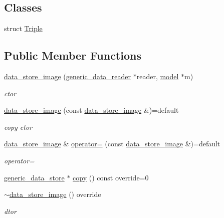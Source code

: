 \subsection*{Classes}
\begin{DoxyCompactItemize}
\item 
struct \hyperlink{structlbann_1_1data__store__image_1_1Triple}{Triple}
\end{DoxyCompactItemize}
\subsection*{Public Member Functions}
\begin{DoxyCompactItemize}
\item 
\hyperlink{classlbann_1_1data__store__image_a8fd8c5546f405a964511823aed8ac986}{data\+\_\+store\+\_\+image} (\hyperlink{classlbann_1_1generic__data__reader}{generic\+\_\+data\+\_\+reader} $\ast$reader, \hyperlink{classlbann_1_1model}{model} $\ast$m)
\begin{DoxyCompactList}\small\item\em ctor \end{DoxyCompactList}\item 
\hyperlink{classlbann_1_1data__store__image_a12a813dca36d7faf2e3b36635faf2aab}{data\+\_\+store\+\_\+image} (const \hyperlink{classlbann_1_1data__store__image}{data\+\_\+store\+\_\+image} \&)=default
\begin{DoxyCompactList}\small\item\em copy ctor \end{DoxyCompactList}\item 
\hyperlink{classlbann_1_1data__store__image}{data\+\_\+store\+\_\+image} \& \hyperlink{classlbann_1_1data__store__image_a997fd4f7961b173e1b03dfe1d81ad96f}{operator=} (const \hyperlink{classlbann_1_1data__store__image}{data\+\_\+store\+\_\+image} \&)=default
\begin{DoxyCompactList}\small\item\em operator= \end{DoxyCompactList}\item 
\hyperlink{classlbann_1_1generic__data__store}{generic\+\_\+data\+\_\+store} $\ast$ \hyperlink{classlbann_1_1data__store__image_ab62efcb2dbe3118bf2815fa5d51fee61}{copy} () const override=0
\item 
\hyperlink{classlbann_1_1data__store__image_a1c6e508be9cbadcd63f79f2e2c24dba8}{$\sim$data\+\_\+store\+\_\+image} () override
\begin{DoxyCompactList}\small\item\em dtor \end{DoxyCompactList}\item 

\end{DoxyCompactItemize}
